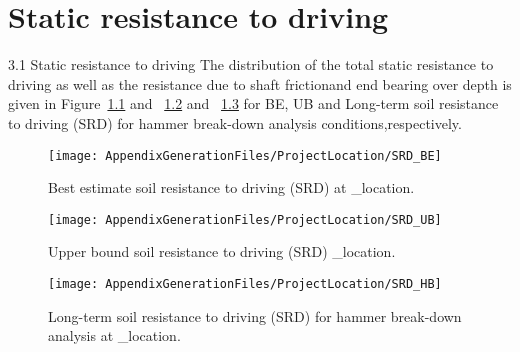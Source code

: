 \chapter{Static resistance to driving}\label{sec_3}

3.1 Static resistance to driving
The distribution of the total static resistance to driving as well as the resistance due to shaft frictionand end bearing over depth is given in Figure~\ref{SRD_BE} and ~\ref{SRD_UB} and ~\ref{SRD_HB} for BE, UB  and Long-term soil resistance to driving (SRD) for hammer break-down analysis conditions,respectively.


\begin{figure}[!htbp]
\texttt{[image: AppendixGenerationFiles/ProjectLocation/SRD\_BE]}
\caption{Best estimate soil resistance to driving (SRD)  at {\ID_location}.}
\label{SRD_BE}
\end{figure}

\begin{figure}[!htbp]
\texttt{[image: AppendixGenerationFiles/ProjectLocation/SRD\_UB]}
\caption{Upper bound soil resistance to driving (SRD) {\ID_location}.}
\label{SRD_UB}
\end{figure}

\begin{figure}[!htbp]
\texttt{[image: AppendixGenerationFiles/ProjectLocation/SRD\_HB]}
\caption{Long-term soil resistance to driving (SRD) for hammer break-down analysis at {\ID_location}.}
\label{SRD_HB}
\end{figure}


\newpage